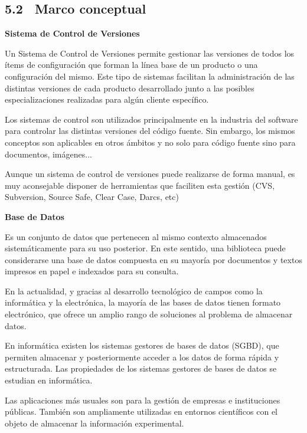 \documentclass[12pt,letterpaper,oneside]{article}
\begin{document}
\bigskip


\bigskip

\subsection[5.2 \ Marco conceptual]{5.2 \ Marco conceptual}

\bigskip

{\bfseries
Sistema de Control de Versiones}

Un Sistema de Control de Versiones permite gestionar las versiones de
todos los ítems de configuración que forman la línea base de un
producto o una configuración del mismo. Este tipo de sistemas
facilitan la administración de las distintas versiones de cada
producto desarrollado junto a las posibles especializaciones realizadas
para algún cliente específico.

Los sistemas de control son utilizados principalmente en la industria
del software para controlar las distintas versiones del código
fuente. Sin embargo, los mismos conceptos son aplicables en otros
ámbitos y no solo para código fuente sino para documentos,
imágenes...

Aunque un sistema de control de versiones puede realizarse de forma
manual, es muy aconsejable disponer de herramientas que faciliten esta
gestión (CVS, Subversion, Source Safe, Clear Case, Darcs, etc)


\bigskip

{\bfseries
Base de Datos}

Es un conjunto de datos que pertenecen al mismo contexto almacenados
sistemáticamente para su uso posterior. En este sentido, una
biblioteca puede considerarse una base de datos compuesta en su
mayoría por documentos y textos impresos en papel e indexados para su
consulta.


\bigskip

En la actualidad, y gracias al desarrollo tecnológico de campos como
la informática y la electrónica, la mayoría de las bases de datos
tienen formato electrónico, que ofrece un amplio rango de soluciones
al problema de almacenar datos.

En informática existen los sistemas gestores de bases de datos (SGBD),
que permiten almacenar y posteriormente acceder a los datos de forma
rápida y estructurada. Las propiedades de los sistemas gestores de
bases de datos se estudian en informática.

Las aplicaciones más usuales son para la gestión de empresas e
instituciones públicas. También son ampliamente utilizadas en
entornos científicos con el objeto de almacenar la información
experimental.
\end{document}
